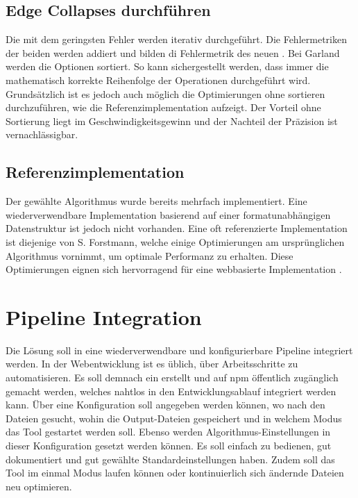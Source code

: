 \subsection{Edge Collapses durchführen}

Die  mit dem geringsten Fehler werden iterativ durchgeführt. Die Fehlermetriken der beiden  werden addiert und bilden di Fehlermetrik des neuen . Bei Garland werden die Optionen sortiert. So kann sichergestellt werden, dass immer die mathematisch korrekte Reihenfolge der Operationen durchgeführt wird. Grundsätzlich ist es jedoch auch möglich die Optimierungen ohne sortieren durchzuführen, wie die Referenzimplementation aufzeigt. Der Vorteil ohne Sortierung liegt im Geschwindigkeitsgewinn und der Nachteil der Präzision ist vernachlässigbar.

\subsection{Referenzimplementation}
Der gewählte Algorithmus wurde bereits mehrfach implementiert. Eine wiederverwendbare Implementation basierend auf einer formatunabhängigen Datenstruktur ist jedoch nicht vorhanden. Eine oft referenzierte Implementation ist diejenige von S. Forstmann, welche einige Optimierungen am ursprünglichen Algorithmus vornimmt, um optimale Performanz zu erhalten. Diese Optimierungen eignen sich hervorragend für eine webbasierte Implementation \cite{fastQuadricMeshSimplification}.

\section{Pipeline Integration}
Die Lösung soll in eine wiederverwendbare und konfigurierbare Pipeline integriert werden.
In der Webentwicklung ist es üblich, über  Arbeitsschritte zu automatisieren. Es soll demnach ein  erstellt und auf \gls{npm} öffentlich zugänglich gemacht werden, welches nahtlos in den Entwicklungsablauf integriert werden kann. Über eine Konfiguration soll angegeben werden können, wo nach den  Dateien gesucht, wohin die Output-Dateien gespeichert und in welchem Modus das Tool gestartet werden soll. Ebenso werden Algorithmus-Einstellungen in dieser Konfiguration gesetzt werden können. Es soll einfach zu bedienen, gut dokumentiert und gut gewählte Standardeinstellungen haben. Zudem soll das Tool im einmal Modus laufen können oder kontinuierlich sich ändernde Dateien neu optimieren.

